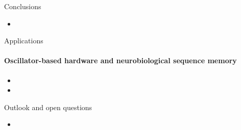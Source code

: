 \documentclass[aspectratio=169]{beamer}
\begin{document}
\begin{frame}{Conclusions}
  \begin{itemize}
    \item
  \end{itemize}
\end{frame}

\begin{frame}{Applications}
  \framesubtitle{Oscillator-based hardware and neurobiological sequence memory}
  \begin{itemize}
    \item
    \item
  \end{itemize}
\end{frame}

\begin{frame}{Outlook and open questions}
  \begin{itemize}
    \item
  \end{itemize}
\end{frame}
\end{document}
